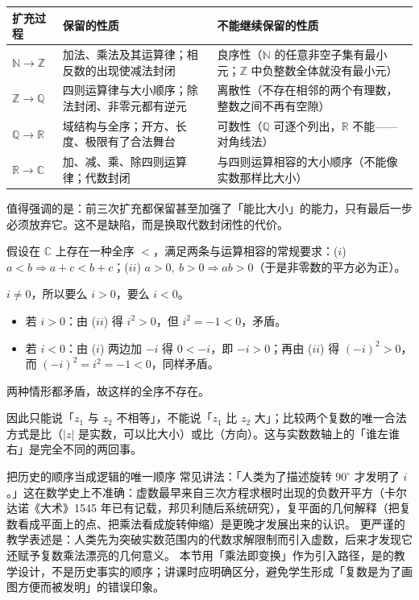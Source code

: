 \begin{explore}
\begin{center}
\footnotesize
\setlength{\tabcolsep}{4pt}
\renewcommand{\arraystretch}{1.5}
\begin{tabular}{p{2.6cm}p{4.6cm}p{4.4cm}}
\toprule
扩充过程 & 保留的性质 & 不能继续保留的性质 \\
\midrule
$\mathbb{N}\to\mathbb{Z}$ & 加法、乘法及其运算律；相反数的出现使减法封闭 & 良序性（$\mathbb{N}$ 的任意非空子集有最小元；$\mathbb{Z}$ 中负整数全体就没有最小元） \\
$\mathbb{Z}\to\mathbb{Q}$ & 四则运算律与大小顺序；除法封闭、非零元都有逆元 & 离散性（不存在相邻的两个有理数，整数之间不再有空隙） \\
$\mathbb{Q}\to\mathbb{R}$ & 域结构与全序；开方、长度、极限有了合法舞台 & 可数性（$\mathbb{Q}$ 可逐个列出，$\mathbb{R}$ 不能——对角线法） \\
$\mathbb{R}\to\mathbb{C}$ & 加、减、乘、除四则运算律；代数封闭 & 与四则运算相容的大小顺序（不能像实数那样比大小） \\
\bottomrule
\end{tabular}
\end{center}

值得强调的是：前三次扩充都保留甚至加强了「能比大小」的能力，只有最后一步必须放弃它。这不是缺陷，而是换取代数封闭性的代价。

假设在 $\mathbb{C}$ 上存在一种全序 $<$，满足两条与运算相容的常规要求：($i$) $a<b\Rightarrow a+c<b+c$；($ii$) $a>0,\ b>0\Rightarrow ab>0$（于是非零数的平方必为正）。
\begin{derivation}
$i\neq0$，所以要么 $i>0$，要么 $i<0$。
\begin{itemize}
  \item 若 $i>0$：由 ($ii$) 得 $i^2>0$，但 $i^2=-1<0$，矛盾。
  \item 若 $i<0$：由 ($i$) 两边加 $-i$ 得 $0<-i$，即 $-i>0$；再由 ($ii$) 得 $(-i)^2>0$，而 $(-i)^2=i^2=-1<0$，同样矛盾。
\end{itemize}
两种情形都矛盾，故这样的全序不存在。
\end{derivation}
因此只能说「$z_1$ 与 $z_2$ 不相等」，不能说「$z_1$ 比 $z_2$ 大」；比较两个复数的唯一合法方式是比（$|z|$ 是实数，可以比大小）或比（方向）。这与实数数轴上的「谁左谁右」是完全不同的两回事。

\begin{commonerror}{把历史的顺序当成逻辑的唯一顺序}
常见讲法：「人类为了描述旋转 $90^\circ$ 才发明了 $i$。」这在数学史上不准确：虚数最早来自三次方程求根时出现的负数开平方（卡尔达诺《大术》1545 年已有记载，邦贝利随后系统研究），复平面的几何解释（把复数看成平面上的点、把乘法看成旋转伸缩）是更晚才发展出来的认识。
更严谨的教学表述是：人类先为突破实数范围内的代数求解限制而引入虚数，后来才发现它还赋予复数乘法漂亮的几何意义。
本节用「乘法即变换」作为引入路径，是的教学设计，不是历史事实的顺序；讲课时应明确区分，避免学生形成「复数是为了画图方便而被发明」的错误印象。
\end{commonerror}


\end{explore}
